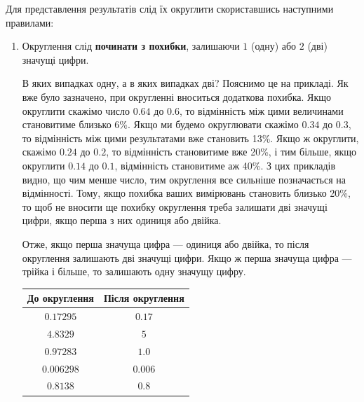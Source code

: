 \documentclass{LabBook}
\begin{document}
Для представлення результатів слід їх округлити скориставшись наступними правилами:
\begin{enumerate}
	\item Округлення слід \textbf{починати з похибки}, залишаючи $1$ (одну) або $2$ (дві) значущі цифри.

	      \begin{Warning}
		      В яких випадках одну, а в яких випадках дві? Пояснимо це на прикладі. Як вже було зазначено, при округленні вноситься додаткова похибка. Якщо округлити скажімо число $0.64$ до $0.6$, то відмінність між цими величинами становитиме близько 6\%. Якщо ми будемо округлювати скажімо $0.34$ до $0.3$, то відмінність між цими результатами вже становить 13\%. Якщо ж округлити, скажімо $0.24$ до $0.2$, то відмінність становитиме вже 20\%, і тим більше, якщо округлити $0.14$ до $0.1$, відмінність становитиме аж 40\%. З цих прикладів видно, що чим менше число, тим округлення все сильніше позначається на відмінності. Тому, якщо похибка ваших вимірювань становить близько 20\%, то щоб не вносити ще похибку округлення треба залишати дві значущі цифри, якщо перша з них одиниця або двійка.
	      \end{Warning}

	      Отже, якщо перша значуща цифра --- одиниця або двійка, то після округлення залишають дві значущі цифри. Якщо ж перша значуща цифра --- трійка і більше, то залишають одну значущу цифру.
	      \begin{center}
		      \begin{tabular}{cc}
			      \toprule
			      До округлення & Після округлення \\ \midrule
			      $0.17295$     & $0.17$           \\
			      $4.8329$      & $5$              \\
			      $0.97283$     & $1.0$            \\
			      $0.006298$    & $0.006$          \\
			      $0.8138$      & $0.8$            \\ \bottomrule
		      \end{tabular}
	      \end{center}


\end{enumerate}
\end{document}
